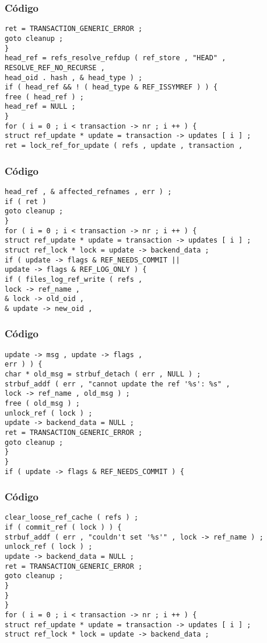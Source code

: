 \documentclass{beamer}
\begin{document}
\begin{frame}[fragile]
\frametitle{C\'odigo}
\begin{verbatim}
ret = TRANSACTION_GENERIC_ERROR ; 
goto cleanup ; 
} 
head_ref = refs_resolve_refdup ( ref_store , "HEAD" , 
RESOLVE_REF_NO_RECURSE , 
head_oid . hash , & head_type ) ; 
if ( head_ref && ! ( head_type & REF_ISSYMREF ) ) { 
free ( head_ref ) ; 
head_ref = NULL ; 
} 
for ( i = 0 ; i < transaction -> nr ; i ++ ) { 
struct ref_update * update = transaction -> updates [ i ] ; 
ret = lock_ref_for_update ( refs , update , transaction , 
\end{verbatim}
\end{frame}
\begin{frame}[fragile]
\frametitle{C\'odigo}
\begin{verbatim}
head_ref , & affected_refnames , err ) ; 
if ( ret ) 
goto cleanup ; 
} 
for ( i = 0 ; i < transaction -> nr ; i ++ ) { 
struct ref_update * update = transaction -> updates [ i ] ; 
struct ref_lock * lock = update -> backend_data ; 
if ( update -> flags & REF_NEEDS_COMMIT || 
update -> flags & REF_LOG_ONLY ) { 
if ( files_log_ref_write ( refs , 
lock -> ref_name , 
& lock -> old_oid , 
& update -> new_oid , 
\end{verbatim}
\end{frame}
\begin{frame}[fragile]
\frametitle{C\'odigo}
\begin{verbatim}
update -> msg , update -> flags , 
err ) ) { 
char * old_msg = strbuf_detach ( err , NULL ) ; 
strbuf_addf ( err , "cannot update the ref '%s': %s" , 
lock -> ref_name , old_msg ) ; 
free ( old_msg ) ; 
unlock_ref ( lock ) ; 
update -> backend_data = NULL ; 
ret = TRANSACTION_GENERIC_ERROR ; 
goto cleanup ; 
} 
} 
if ( update -> flags & REF_NEEDS_COMMIT ) { 
\end{verbatim}
\end{frame}
\begin{frame}[fragile]
\frametitle{C\'odigo}
\begin{verbatim}
clear_loose_ref_cache ( refs ) ; 
if ( commit_ref ( lock ) ) { 
strbuf_addf ( err , "couldn't set '%s'" , lock -> ref_name ) ; 
unlock_ref ( lock ) ; 
update -> backend_data = NULL ; 
ret = TRANSACTION_GENERIC_ERROR ; 
goto cleanup ; 
} 
} 
} 
for ( i = 0 ; i < transaction -> nr ; i ++ ) { 
struct ref_update * update = transaction -> updates [ i ] ; 
struct ref_lock * lock = update -> backend_data ; 
\end{verbatim}
\end{frame}
\end{document}
